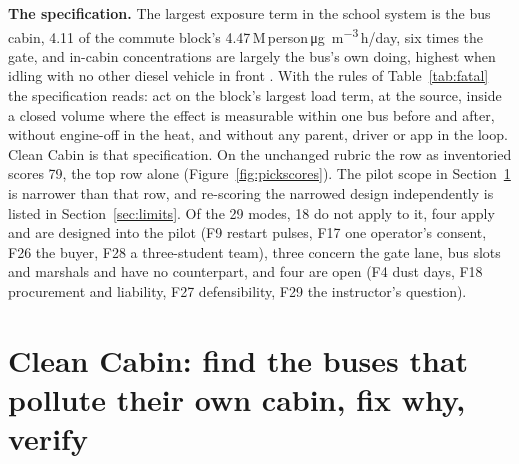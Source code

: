 \documentclass[10pt,a4paper]{article}
\newcommand{\ugm}{\si{\micro\gram\per\cubic\metre}}
\newcommand{\load}{M\,person\,\ugm\,h/day}
\begin{document}
\textbf{The specification.} The largest exposure term in the school system is the bus cabin, \num{4.11} of the commute block's \num{4.47}\,\load, six times the gate, and in-cabin concentrations are largely the bus's own doing, highest when idling with no other diesel vehicle in front \citep{Behrentz2005}. With the rules of Table~\ref{tab:fatal} the specification reads: act on the block's largest load term, at the source, inside a closed volume where the effect is measurable within one bus before and after, without engine-off in the heat, and without any parent, driver or app in the loop. Clean Cabin is that specification. On the unchanged rubric the row as inventoried scores 79, the top row alone (Figure~\ref{fig:pickscores}). The pilot scope in Section~\ref{sec:cabin} is narrower than that row, and re-scoring the narrowed design independently is listed in Section~\ref{sec:limits}. Of the 29 modes, 18 do not apply to it, four apply and are designed into the pilot (F9 restart pulses, F17 one operator's consent, F26 the buyer, F28 a three-student team), three concern the gate lane, bus slots and marshals and have no counterpart, and four are open (F4 dust days, F18 procurement and liability, F27 defensibility, F29 the instructor's question).

\section{Clean Cabin: find the buses that pollute their own cabin, fix why, verify}\label{sec:cabin}
\end{document}
